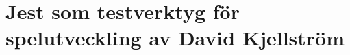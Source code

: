 \chapter{Jest som testverktyg för spelutveckling av David Kjellström}
\label{individual:david}







